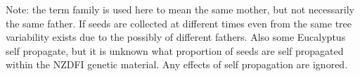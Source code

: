 Note: the term family is used here to mean the same mother, but not necessarily
the same father. If seeds are collected at different times even from the same
tree variability exists due to the possibly of different fathers. Also some
Eucalyptus self propagate, but it is unknown what proportion of
seeds are self propagated within the NZDFI genetic material. Any effects of self
propagation are ignored.